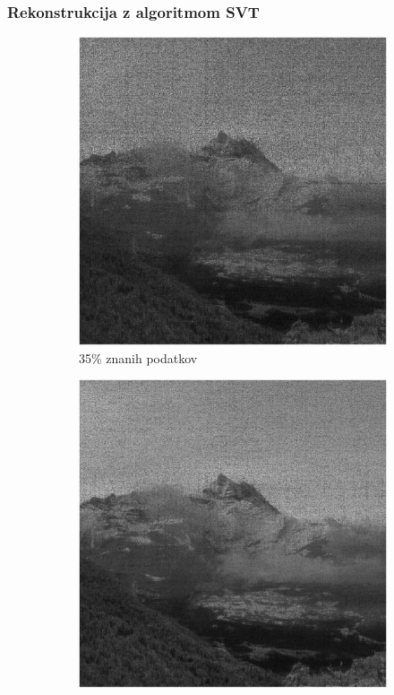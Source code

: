 \documentclass{beamer}
\begin{document}
\begin{frame}
  \frametitle{Rekonstrukcija z algoritmom SVT}
  \begin{figure}
    \begin{subfigure}{0.325\linewidth}
      \includegraphics[width=\linewidth]{slike/gora/slikaRez35SVT.png}
      \caption{35\% znanih podatkov}
    \end{subfigure}
    \begin{subfigure}{0.325\linewidth}
      \includegraphics[width=\linewidth]{slike/gora/slikaRez45SVT.png}

\end{subfigure}
\end{figure}
\end{frame}
\end{document}
